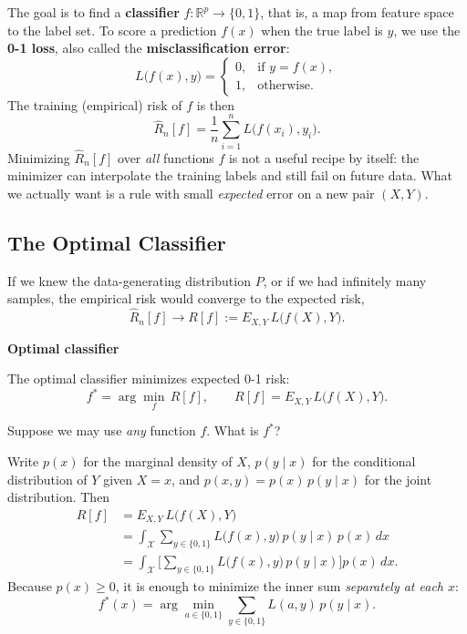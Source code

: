 \documentclass[
]{book}
\begin{document}
The goal is to find a \textbf{classifier}
\(f: \mathbb{R}^p \rightarrow \{0, 1\}\),
that is, a map from feature space to the label set. To score a prediction \(f(x)\) when the true label is \(y\), we use the \textbf{0-1 loss}, also called the \textbf{misclassification error}:
\[
L\bigl(f(x), y\bigr) =
\begin{cases}
0, & \text{if } y = f(x),\\
1, & \text{otherwise}.
\end{cases}
\]
The training (empirical) risk of \(f\) is then
\[
\widehat{R}_n[f] = \frac{1}{n} \sum_{i=1}^{n} L\bigl(f(x_i), y_i\bigr).
\]
Minimizing \(\widehat{R}_n[f]\) over \emph{all} functions \(f\) is not a useful recipe by itself: the minimizer can interpolate the training labels and still fail on future data. What we actually want is a rule with small \emph{expected} error on a new pair \((X, Y)\).

\subsection*{The Optimal Classifier}\label{the-optimal-classifier}

If we knew the data-generating distribution \(P\), or if we had infinitely many samples, the empirical risk would converge to the expected risk,
\[
\widehat{R}_n[f] \longrightarrow R[f] := E_{X,Y}\, L\bigl(f(X), Y\bigr).
\]

\textbf{Optimal classifier}

The optimal classifier minimizes expected 0-1 risk:
\[
f^* = \arg\min_f \, R[f], \qquad R[f] = E_{X,Y}\, L\bigl(f(X), Y\bigr).
\]

Suppose we may use \emph{any} function \(f\). What is \(f^*\)?

Write \(p(x)\) for the marginal density of \(X\), \(p(y \mid x)\) for the conditional distribution of \(Y\) given \(X = x\), and \(p(x,y) = p(x)\,p(y \mid x)\) for the joint distribution. Then
\begin{align*}
R[f]
&= E_{X,Y}\, L\bigl(f(X), Y\bigr) \\
&= \int_{\mathcal{X}} \sum_{y \in \{0,1\}} L\bigl(f(x), y\bigr)\, p(y \mid x)\, p(x)\, dx \\
&= \int_{\mathcal{X}}
\Biggl[
\sum_{y \in \{0,1\}} L\bigl(f(x), y\bigr)\, p(y \mid x)
\Biggr] p(x)\, dx.
\end{align*}
Because \(p(x) \ge 0\), it is enough to minimize the inner sum \emph{separately at each \(x\)}:
\[
f^*(x) = \arg\min_{a \in \{0,1\}} \sum_{y \in \{0,1\}} L(a, y)\, p(y \mid x).
\]
\end{document}
